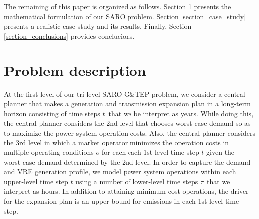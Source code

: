 \documentclass[final]{IEEEtran}
\begin{document}
The remaining of this paper is organized as follows. Section \ref{section_problem} presents the mathematical formulation of our SARO problem. Section \ref{section_case_study} presents a realistic case study and its results. Finally, Section \ref{section_conclusions} provides conclucions.

\section{Problem description}
\label{section_problem}






At the first level of our tri-level SARO G\&TEP problem, we consider a central planner that makes a generation and transmission expansion plan in a long-term horizon consisting of time steps $t$ that we be interpret as years. While doing this, the central planner considers the 2nd level
that chooses worst-case demand so as to maximize the power system operation costs. Also, the central planner considers the 3rd level in which a market operator minimizes the operation costs in multiple operating conditions $o$ for each each 1st level time step $t$ given the worst-case demand determined by the 2nd level. In order to capture the demand and VRE generation profile, we model power system operations within each upper-level time step $t$ using a number of lower-level time steps $\tau$ that we interpret as hours. In addition to attaining minimum cost operations, the driver for the expansion plan is an upper bound for emissions in each 1st level time step.
\end{document}
